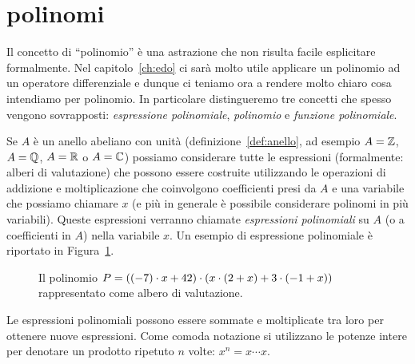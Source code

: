 \section{polinomi}
\label{ch:polinomi}

Il concetto di ``polinomio'' è una astrazione che non risulta facile esplicitare formalmente.
Nel capitolo~\ref{ch:edo} ci sarà molto utile applicare un polinomio ad un operatore 
differenziale e dunque ci teniamo ora a rendere molto chiaro cosa intendiamo per polinomio.
In particolare distingueremo tre concetti che spesso vengono sovrapposti: 
\emph{espressione polinomiale}, \emph{polinomio} e \emph{funzione polinomiale}.

Se $A$ è un anello abeliano con unità 
(definizione~\ref{def:anello}, 
ad esempio $A={\mathbb Z}$, $A={\mathbb Q}$, $A={\mathbb R}$ o $A={\mathbb C}$)
possiamo considerare tutte le espressioni
(formalmente: alberi di valutazione)
che possono essere costruite utilizzando le operazioni
di addizione e moltiplicazione che coinvolgono coefficienti presi da $A$
e una variabile che possiamo chiamare $x$ 
(e più in generale è possibile considerare polinomi in più variabili).
Queste espressioni verranno chiamate \emph{espressioni polinomiali}%
%
 su $A$
(o a coefficienti in $A$) nella variabile $x$. 
Un esempio di espressione polinomiale
è riportato in Figura~\ref{fig:49389}.
\begin{figure}
\begin{center}
\end{center}
\caption{Il polinomio $P = {\left( (-7)\cdot x + 42 \right)}\cdot(x\cdot (2+x) + 3\cdot(-1+x))$
rappresentato come albero di valutazione.}
\label{fig:49389}%
\end{figure}
Le espressioni polinomiali possono essere sommate e moltiplicate tra loro 
per ottenere nuove espressioni. 
Come comoda notazione si utilizzano le potenze intere per 
denotare un prodotto ripetuto $n$ volte: $x^n = x\cdots x$.

